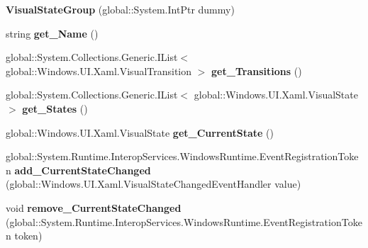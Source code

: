 \begin{DoxyCompactItemize}
\item 
\mbox{\label{class_windows_1_1_u_i_1_1_xaml_1_1_visual_state_group_a8f7185159b1235d9b31261ec34a8498c}} 
{\bfseries Visual\+State\+Group} (global\+::\+System.\+Int\+Ptr dummy)
\item 
\mbox{\label{class_windows_1_1_u_i_1_1_xaml_1_1_visual_state_group_a2813cd015a01c964c6588672b185ac26}} 
string {\bfseries get\+\_\+\+Name} ()
\item 
\mbox{\label{class_windows_1_1_u_i_1_1_xaml_1_1_visual_state_group_a3738f82b20d960a14fdcfb568b232d49}} 
global\+::\+System.\+Collections.\+Generic.\+I\+List$<$ global\+::\+Windows.\+U\+I.\+Xaml.\+Visual\+Transition $>$ {\bfseries get\+\_\+\+Transitions} ()
\item 
\mbox{\label{class_windows_1_1_u_i_1_1_xaml_1_1_visual_state_group_a5f5c4abd2e95e2f7522780c26a7db8fd}} 
global\+::\+System.\+Collections.\+Generic.\+I\+List$<$ global\+::\+Windows.\+U\+I.\+Xaml.\+Visual\+State $>$ {\bfseries get\+\_\+\+States} ()
\item 
\mbox{\label{class_windows_1_1_u_i_1_1_xaml_1_1_visual_state_group_a74be4bea547bdf72e792a3c489cb7878}} 
global\+::\+Windows.\+U\+I.\+Xaml.\+Visual\+State {\bfseries get\+\_\+\+Current\+State} ()
\item 
\mbox{\label{class_windows_1_1_u_i_1_1_xaml_1_1_visual_state_group_ab8a602f85c6928ad4dbda31b0fc3d4fc}} 
global\+::\+System.\+Runtime.\+Interop\+Services.\+Windows\+Runtime.\+Event\+Registration\+Token {\bfseries add\+\_\+\+Current\+State\+Changed} (global\+::\+Windows.\+U\+I.\+Xaml.\+Visual\+State\+Changed\+Event\+Handler value)
\item 
\mbox{\label{class_windows_1_1_u_i_1_1_xaml_1_1_visual_state_group_a51b022e4c0673d691c79a0f52b0ca0af}} 
void {\bfseries remove\+\_\+\+Current\+State\+Changed} (global\+::\+System.\+Runtime.\+Interop\+Services.\+Windows\+Runtime.\+Event\+Registration\+Token token)

\end{DoxyCompactItemize}
